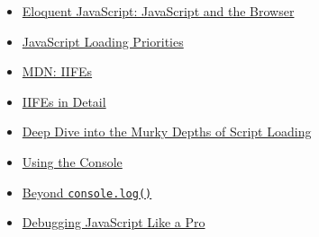 \begin{itemize}[leftmargin=*]
    \item \href{https://eloquentjavascript.net/12_browser.html}{Eloquent JavaScript: JavaScript and the Browser}
    \item \href{https://addyosmani.com/blog/script-priorities/}{JavaScript Loading Priorities}
    \item \href{https://developer.mozilla.org/en-US/docs/Glossary/IIFE}{MDN: IIFEs}
    \item \href{http://benalman.com/news/2010/11/immediately-invoked-function-expression/}{IIFEs in Detail}
    \item \href{https://www.html5rocks.com/en/tutorials/speed/script-loading/}{Deep Dive into the Murky Depths of Script Loading}
    \item \href{https://developers.google.com/web/tools/chrome-devtools/console/}{Using the Console}
    \item \href{https://medium.com/@mattburgess/beyond-console-log-2400fdf4a9d8}{Beyond \texttt{console.log()}}
    \item \href{https://blog.bitsrc.io/debugging-javascript-like-a-pro-a2e0f6c53c2e}{Debugging JavaScript Like a Pro}
\end{itemize}
